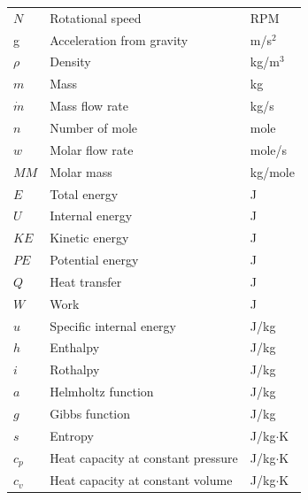 \documentclass[12pt,a4paper]{report}
\begin{document}
\begin{longtable}[c]{lll}
$N$          & Rotational speed                            & RPM            \\
g            & Acceleration from gravity                   & m/s$^2$        \\
$\rho$       & Density                                     & kg/m$^3$       \\
$m$          & Mass                                        & kg             \\
$\dot{m}$    & Mass flow rate                              & kg/s           \\
$n$          & Number of mole                              & mole           \\
$w$          & Molar flow rate                             & mole/s         \\
$MM$         & Molar mass                                  & kg/mole        \\
$E$          & Total energy                                & J              \\
$U$          & Internal energy                             & J              \\
$KE$         & Kinetic energy                              & J              \\
$PE$         & Potential energy                            & J              \\
$Q$          & Heat transfer                               & J              \\
$W$          & Work                                        & J              \\
$u$          & Specific internal energy                    & J/kg           \\
$h$          & Enthalpy                                    & J/kg           \\
$i$          & Rothalpy                                    & J/kg           \\
$a$          & Helmholtz function                          & J/kg           \\
$g$          & Gibbs function                              & J/kg           \\
$s$          & Entropy                                     & J/kg$\cdot$K   \\
$c_p$        & Heat capacity at constant pressure          & J/kg$\cdot$K   \\
$c_v$        & Heat capacity at constant volume            & J/kg$\cdot$K   \\

\end{longtable}
\end{document}
